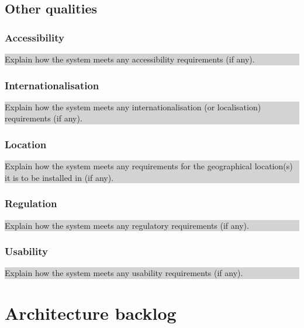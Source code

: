 \documentclass[a4paper,11pt]{report}
\newcommand{\instructions}[1]{
  \noindent\colorbox{lightgray}{%
    \parbox{\linewidth}{%
      #1
    }%
  }%
 \vspace{0.1cm}
}
\begin{document}
\section{Other qualities}
\label{sec:other-qualities}

\subsection{Accessibility}
\label{sec:accessibility}

\instructions{
Explain how the system meets any accessibility requirements (if any).
}

\subsection{Internationalisation}
\label{sec:internationalisation}

\instructions{
Explain how the system meets any internationalisation (or
localisation) requirements (if any).
}

\subsection{Location}
\label{sec:location}

\instructions{
Explain how the system meets any requirements for the geographical
location(s) it is to be installed in (if any).
}

\subsection{Regulation}
\label{sec:regulation}

\instructions{
Explain how the system meets any regulatory requirements (if any).
}

\subsection{Usability}
\label{sec:usability}

\instructions{
Explain how the system meets any usability requirements (if any).
}

\appendix

\chapter{Architecture backlog}
\label{cha:architecture-backlog}
\thispagestyle{fancy}
\end{document}
